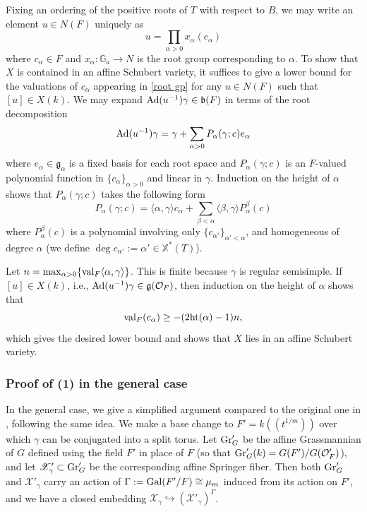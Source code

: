 \documentclass[]{pcmi}
\let\oldsubsubsection\subsubsection
\renewcommand{\subsubsection}[1]{%
\setcounter{subsubsection}{\value{equation}}%
\oldsubsubsection{#1}%
\refstepcounter{equation}%
}
\theoremstyle{plain}
\theoremstyle{definition}
\def\GG{\mathbb{G}}
\def\calO{\mathcal{O}}
\newcommand{\sX}{\ensuremath{\mathscr{X}}\xspace}
\newcommand{\sX}{\ensuremath{\mathcal{X}}\xspace}
\newcommand\frb{\mathfrak{b}}
\newcommand\frg{\mathfrak{g}}
\newcommand\Gal{\textup{Gal}}
\newcommand{\Gr}{\textup{Gr}}
\newcommand{\val}{\textup{val}}
\def\Ga{\GG_a}
\newcommand{\Ad}{\textup{Ad}}
\newcommand\xch{\mathbb{X}^*}
\newcommand{\incl}{\hookrightarrow}
\newcommand{\jiao}[1]{\langle{#1}\rangle}
\newcommand{\lr}[1]{(\!(#1)\!)}
\begin{document}
Fixing an ordering of the positive roots of $T$ with respect to $B$, we may write an element  $u\in N(F)$ uniquely as
\begin{equation}\label{root gp}
u=\prod_{\alpha>0}x_{\alpha}(c_{\alpha})
\end{equation}
where $c_{\alpha}\in F$ and $x_{\alpha}: \Ga\to N$ is the root group corresponding to $\alpha$. To show that $X$ is contained in an affine Schubert variety, it suffices to give a lower bound for the valuations of $c_{\alpha}$ appearing in \eqref{root gp} for any $u\in N(F)$ such that $[u]\in X(k)$. We may expand $\Ad(u^{-1})\gamma\in\frb(F)$ in terms of the root decomposition
\begin{equation*}
\Ad(u^{-1})\gamma=\gamma+\sum_{\alpha>0}P_{\alpha}(\gamma; c)e_{\alpha}
\end{equation*} 
where $e_{\alpha}\in\frg_{\alpha}$ is a fixed basis for each root space and $P_{\alpha}(\gamma;c)$ is an $F$-valued polynomial function in $\{c_{\alpha}\}_{\alpha>0}$ and linear in $\gamma$. Induction on the height of $\alpha$ shows that $P_{\alpha}(\gamma;c)$ takes the following form
\begin{equation}\label{conj u gamma}
P_{\alpha}(\gamma;c)=\jiao{\alpha,\gamma}c_{\alpha}+\sum_{\beta<\alpha}\jiao{\beta,\gamma}P^{\beta}_{\alpha}(c)
\end{equation}
where $P^{\beta}_{\alpha}(c)$ is a polynomial involving only $\{c_{\alpha'}\}_{\alpha'<\alpha}$, and homogeneous of degree $\alpha$ (we define $\deg c_{\alpha'}:=\alpha'\in\xch(T)$). 

Let $n=\max_{\alpha>0}\{\val_{F}\jiao{\alpha,\gamma}\}$. This is finite because $\gamma$  is regular semisimple. If $[u]\in X(k)$, i.e., $\Ad(u^{-1})\gamma\in\frg(\calO_{F})$, then induction on the height of $\alpha$ shows that
\begin{equation*}
\val_{F}(c_{\alpha})\geq -(2\textup{ht}(\alpha)-1)n,
\end{equation*} 
which gives the desired lower bound and shows that $X$ lies in an affine Schubert variety.

\subsubsection{Proof of (1) in the general case} In the general case, we give a simplified argument compared to the original one in \cite{KL}, following the same idea. We make a base change to $F'=k\lr{t^{1/m}}$ over which $\gamma$ can be conjugated into a split torus. Let $\Gr'_{G}$ be the affine Grassmannian of $G$ defined using the field $F'$ in place of $F$ (so that $\Gr'_{G}(k)=G(F')/G(\calO'_{F})$), and let $\sX'_{\gamma}\subset\Gr'_{G}$ be the corresponding affine Springer fiber. Then both $\Gr'_{G}$ and $\sX'_{\gamma}$ carry an action of $\Gamma:=\Gal(F'/F)\cong\mu_{m}$ induced from its action on $F'$, and we have a closed embedding $\sX_{\gamma}\incl (\sX'_{\gamma})^{\Gamma}$. 
\end{document}
